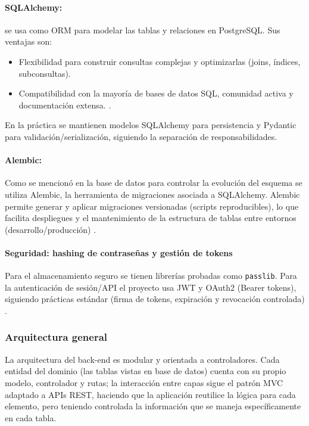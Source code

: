 \documentclass[12pt, a4paper]{article}
\begin{document}
\paragraph{SQLAlchemy:} se usa como ORM para modelar las tablas y relaciones en PostgreSQL. Sus ventajas son:
\begin{itemize}
	\item Flexibilidad para construir consultas complejas y optimizarlas (joins, índices, subconsultas).
	\item Compatibilidad con la mayoría de bases de datos SQL, comunidad activa y documentación extensa. \cite{SQLAlchemy}.
\end{itemize}
En la práctica se mantienen modelos SQLAlchemy para persistencia y Pydantic para validación/serialización, siguiendo la separación de responsabilidades.

\paragraph{Alembic:}
Como se mencionó en la base de datos para controlar la evolución del esquema se utiliza Alembic, la herramienta de migraciones asociada a SQLAlchemy. Alembic permite generar y aplicar migraciones versionadas (scripts reproducibles), lo que facilita despliegues y el mantenimiento de la estructura de tablas entre entornos (desarrollo/producción) \cite{Alembic}.

\paragraph{Seguridad: hashing de contraseñas y gestión de tokens}
Para el almacenamiento seguro se tienen librerías probadas como \texttt{passlib}\cite{Passlib}. Para la autenticación de sesión/API el proyecto usa JWT y OAuth2 (Bearer tokens), siguiendo prácticas estándar (firma de tokens, expiración y revocación controlada) \cite{JWT}. 


\subsubsection{Arquitectura general}

La arquitectura del back-end es modular y orientada a controladores. Cada entidad del dominio (las tablas vistas en base de datos) cuenta con su propio modelo, controlador y rutas; la interacción entre capas sigue el patrón MVC adaptado a APIs REST, haciendo que la aplicación reutilice la lógica para cada elemento, pero teniendo controlada la información que se maneja específicamente en cada tabla.
\end{document}

